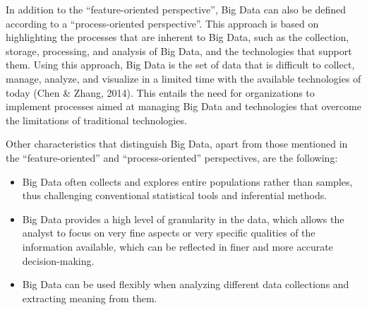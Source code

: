 \documentclass[
  letterpaper,
  DIV=11,
  numbers=noendperiod]{scrreprt}
\begin{document}
In addition to the ``feature-oriented perspective'', Big Data can also
be defined according to a ``process-oriented perspective''. This
approach is based on highlighting the processes that are inherent to Big
Data, such as the collection, storage, processing, and analysis of Big
Data, and the technologies that support them. Using this approach, Big
Data is the set of data that is difficult to collect, manage, analyze,
and visualize in a limited time with the available technologies of today
(Chen \& Zhang, 2014). This entails the need for organizations to
implement processes aimed at managing Big Data and technologies that
overcome the limitations of traditional technologies.

Other characteristics that distinguish Big Data, apart from those
mentioned in the ``feature-oriented'' and ``process-oriented''
perspectives, are the following:

\begin{itemize}
\item
  Big Data often collects and explores entire populations rather than
  samples, thus challenging conventional statistical tools and
  inferential methods.
\item
  Big Data provides a high level of granularity in the data, which
  allows the analyst to focus on very fine aspects or very specific
  qualities of the information available, which can be reflected in
  finer and more accurate decision-making.
\item
  Big Data can be used flexibly when analyzing different data
  collections and extracting meaning from them.
\end{itemize}
\end{document}
